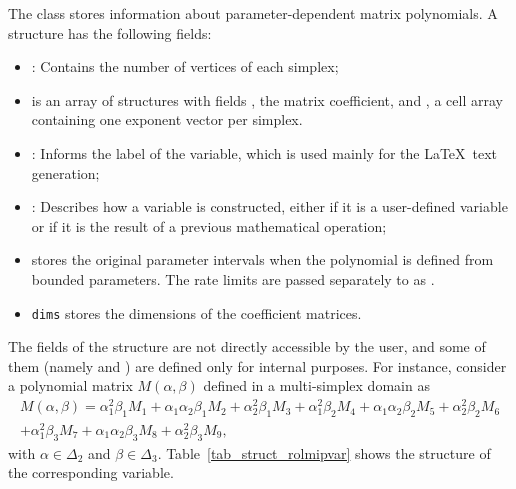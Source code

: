 \documentclass[english,11pt]{article}
\theoremstyle{break} \theorembodyfont{\small\rm}
\begin{document}
The  class stores information about parameter-dependent
matrix polynomials. A  structure has the following fields:
\begin{itemize}
 \item {}: Contains the number of vertices of each simplex;

\item
   is an array of structures with fields , the matrix
  coefficient, and , a cell array containing one exponent
  vector per simplex.

 \item {}: Informs the label of the variable, which is used mainly for the \LaTeX ~text
 generation;

 \item {}: Describes how a variable is constructed, either if it is a user-defined variable
 or if it is the result of a previous mathematical operation;

\item
   stores the original parameter intervals when the polynomial is
  defined from bounded parameters. The rate limits are passed separately to
   as .
\item \texttt{dims} stores the dimensions of the coefficient matrices.
\end{itemize}

The fields of the  structure are not directly accessible by the user, and some of them (namely   and
) are defined only for internal purposes.
For instance, consider a polynomial matrix $M(\alpha,\beta)$ defined in a multi-simplex domain as
\begin{multline}\label{eq_ex1_M}
  M(\alpha,\beta) = \alpha_1^2\beta_1 M_1 + \alpha_1\alpha_2\beta_1 M_2 + \alpha_2^2\beta_1 M_3 +
  \alpha_1^2\beta_2 M_4 + \alpha_1\alpha_2\beta_2 M_5 + \alpha_2^2\beta_2 M_6  \\ +
  \alpha_1^2\beta_3 M_7 + \alpha_1\alpha_2\beta_3 M_8 + \alpha_2^2\beta_3 M_9,
 \end{multline}
with $\alpha \in \Delta_2$ and $\beta \in \Delta_3$.
Table~\ref{tab_struct_rolmipvar} shows the structure of the corresponding
 variable.
\end{document}
